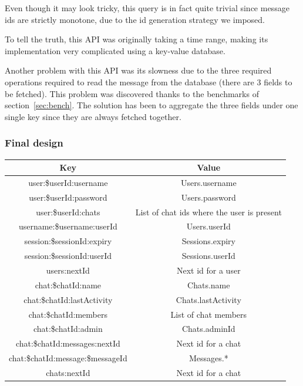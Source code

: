 \documentclass[10pt]{article}
\begin{document}
Even though it may look tricky, this query is in fact quite trivial since 
message ids are strictly monotone, due to the id generation strategy we 
imposed.

To tell the truth, this API was originally taking a time range, making its 
implementation very complicated using a key-value database.

Another problem with this API was its slowness due to the three required 
operations required to read the message from the database (there are 
3 fields to be fetched). This problem was discovered thanks to the benchmarks
of section~\ref{sec:bench}. The solution has been to aggregate the three fields 
under one single key since they are always fetched together.

\subsubsection{Final design}
\begin{center}
\begin{tabular}{ | c | c | }
    \hline
    \textbf{Key} & \textbf{Value} \\\hline
    user:\$userId:username & Users.username \\\hline
    user:\$userId:password & Users.password \\\hline
    user:\$userId:chats & List of chat ids where the user is present \\\hline
    username:\$username:userId & Users.userId \\\hline
    session:\$sessionId:expiry & Sessions.expiry \\\hline
    session:\$sessionId:userId & Sessions.userId \\\hline
    users:nextId & Next id for a user \\\hline
    chat:\$chatId:name & Chats.name \\\hline
    chat:\$chatId:lastActivity & Chats.lastActivity \\\hline
    chat:\$chatId:members & List of chat members \\\hline
    chat:\$chatId:admin & Chats.adminId\\\hline
    chat:\$chatId:messages:nextId & Next id for a chat \\\hline
    chat:\$chatId:message:\$messageId & Messages.* \\\hline
    chats:nextId & Next id for a chat \\\hline
\end{tabular}
\end{center}
\end{document}
